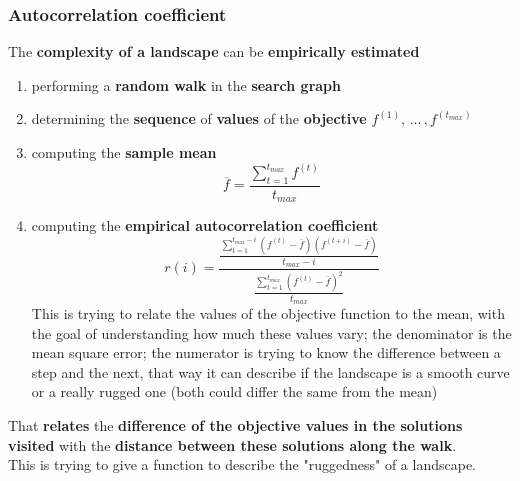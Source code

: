\subsubsection{Autocorrelation coefficient}
The \textbf{complexity of a landscape} can be \textbf{empirically estimated}
\begin{enumerate}
	\item performing a \textbf{random walk} in the \textbf{search graph}
	
	\item determining the \textbf{sequence} of \textbf{values} of the \textbf{objective} $f^{(1)}, \, ... \, , f^{(t_{max})}$
	
	\item computing the \textbf{sample mean} 
	$$ \overline{f} = \frac{\displaystyle \sum_{t=1}^{t_{max}} f^{(t)}}{\displaystyle t_{max}} $$
	
	\item computing the \textbf{empirical autocorrelation coefficient}
	$$ r(i) = \frac{\displaystyle \frac{\displaystyle \sum_{t=1}^{t_{max} - i} \left(f^{(t)} - \overline{f}\right) \left(f^{(t+i)} - \overline{f}\right) }{\displaystyle t_{max} - i } }{\displaystyle \frac{\displaystyle \sum_{t=1}^{t_{max}} \left(f^{(t)} - \overline{f}\right)^2 }{\displaystyle t_{max} }}$$
	This is trying to relate the values of the objective function to the mean, with the goal of understanding how much these values vary; the denominator is the mean square error; the numerator is trying to know the difference between a step and the next, that way it can describe if the landscape is a smooth curve or a really rugged one (both could differ the same from the mean)
\end{enumerate}
That \textbf{relates} the \textbf{difference of the objective values in the solutions visited} with the \textbf{distance between these solutions along the walk}.\\

This is trying to give a function to describe the "ruggedness" of a landscape.\\

\newpage


